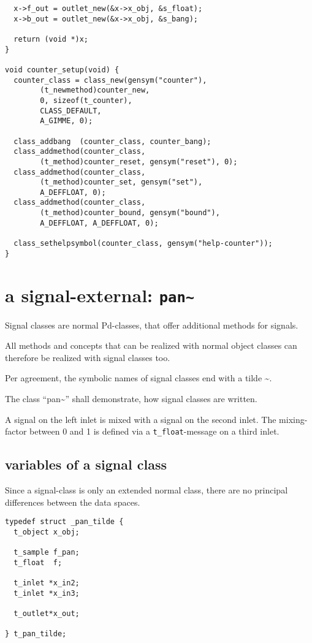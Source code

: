 \documentclass[12pt, a4paper,english,titlepage]{article}
\begin{document}
\begin{verbatim}
  x->f_out = outlet_new(&x->x_obj, &s_float);
  x->b_out = outlet_new(&x->x_obj, &s_bang);

  return (void *)x;
}

void counter_setup(void) {
  counter_class = class_new(gensym("counter"),
        (t_newmethod)counter_new,
        0, sizeof(t_counter),
        CLASS_DEFAULT, 
        A_GIMME, 0);

  class_addbang  (counter_class, counter_bang);
  class_addmethod(counter_class,
        (t_method)counter_reset, gensym("reset"), 0);
  class_addmethod(counter_class, 
        (t_method)counter_set, gensym("set"),
        A_DEFFLOAT, 0);
  class_addmethod(counter_class,
        (t_method)counter_bound, gensym("bound"),
        A_DEFFLOAT, A_DEFFLOAT, 0);

  class_sethelpsymbol(counter_class, gensym("help-counter"));
}
\end{verbatim}


\section{a signal-external: {\tt pan\~\/}}
Signal classes are normal Pd-classes, that offer additional methods for signals.


All methods and concepts that can be realized with normal object classes can
therefore be realized with signal classes too.

Per agreement, the symbolic names of signal classes end with a tilde \~\/.

The class ``pan\~\/'' shall demonstrate, how signal classes are written.

A signal on the left inlet is mixed with a signal on the second inlet.
The mixing-factor between 0 and 1 is defined via a \verb+t_float+-message
on a third inlet.

\subsection{variables of a signal class}
Since a signal-class is only an extended normal class,
there are no principal differences between the data spaces.

\begin{verbatim}
typedef struct _pan_tilde {
  t_object x_obj;

  t_sample f_pan;
  t_float  f;

  t_inlet *x_in2;
  t_inlet *x_in3;

  t_outlet*x_out;

} t_pan_tilde;
\end{verbatim}
\end{document}
